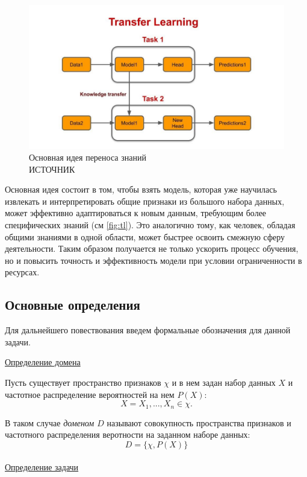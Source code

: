 \begin{figure}[h]
	\centering
	\includegraphics[width=\textwidth]{./images/TL_medium.jpg}
	\caption{Основная идея переноса знаний\\ИСТОЧНИК}
	\label{fig:tl}
\end{figure}

Основная идея состоит в том, чтобы взять модель, которая уже научилась извлекать и интерпретировать общие признаки из большого набора данных, может эффективно адаптироваться к новым данным, требующим более специфических знаний (см \autoref{fig:tl}). Это аналогично тому, как человек, обладая общими знаниями в одной области, может быстрее освоить смежную сферу деятельности. Таким образом получается не только ускорить процесс обучения, но и повысить точность и эффективность модели при условии ограниченности в ресурсах. 

\subsection{Основные определения}

Для дальнейшего повествования введем формальные обозначения для данной задачи.

\underline{Определение домена}

Пусть существует пространство признаков $\chi$ и в нем задан набор данных $X$ и частотное распределение вероятностей на нем $P(X)$:
$$
	X = {X_1, ..., X_n} \in \chi.
$$

В таком случае \textit{доменом $D$} называют совокупность пространства признаков и частотного распределения веротности на заданном наборе данных:
\begin{equation}
D = \{\chi, P(X)\}
\end{equation}
\\
\underline{Определение задачи}

